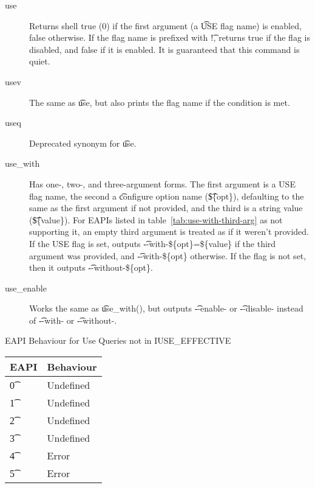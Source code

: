 \begin{description}
\item[use] Returns shell true (0) if the first argument (a \t{USE} flag name) is enabled, false
    otherwise.  If the flag name is prefixed with \t{!}, returns true if the flag is disabled, and
    false if it is enabled. It is guaranteed that this command is quiet.
\item[usev] The same as \t{use}, but also prints the flag name if the condition
    is met.
\item[useq] Deprecated synonym for \t{use}.
\item[use\_with]  Has one-, two-, and three-argument forms. The first
    argument is a USE flag name, the second a \t{configure} option name (\t{\$\{opt\}}), defaulting
    to the same as the first argument if not provided, and the third is a string value
    (\t{\$\{value\}}). For EAPIs listed in table~\ref{tab:use-with-third-arg} as not supporting it,
    an empty third argument is treated as if it weren't provided. If the USE flag is set, outputs
    \t{-{}-with-\$\{opt\}=\$\{value\}} if the third argument was provided, and
    \t{-{}-with-\$\{opt\}} otherwise. If the flag is not set, then it outputs
    \t{-{}-without-\$\{opt\}}.
\item[use\_enable] Works the same as \t{use\_with()}, but outputs \t{-{}-enable-} or \t{-{}-disable-}
instead of \t{-{}-with-} or \t{-{}-without-}.
\end{description}

\begin{centertable}{EAPI Behaviour for Use Queries not in IUSE\_EFFECTIVE} \label{tab:use-list-strictness}
    \begin{tabular}{ l l }
        \toprule
            \multicolumn{1}{c}{\textbf{EAPI}} &
            \multicolumn{1}{c}{\textbf{Behaviour}} \\
            \midrule
    \t{0} & Undefined \\
    \t{1} & Undefined  \\
    \t{2} & Undefined \\
    \t{3} & Undefined \\
    \t{4} & Error \\
    \t{5} & Error \\
    \bottomrule
    \end{tabular}
\end{centertable}

